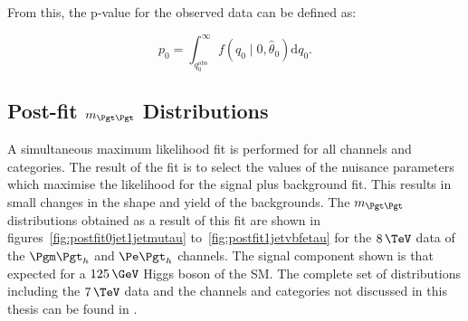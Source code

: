 From this, the p-value for the observed data can be defined as:

\begin{equation}
p_{0} =
\int_{q_{0}^{\mathrm{obs}}}^{\infty}f(q_{0}\mid0,\hat{\theta}_{0})\mathrm{d}q_{0}
.
\end{equation}


\subsection{Post-fit $m_{\Pgt\Pgt}$ Distributions}

A simultaneous maximum likelihood fit is performed for all channels and
categories. The result of the fit is to select the values of the nuisance
parameters which maximise the likelihood for the signal plus background fit.
This results in small changes in the shape and yield of the backgrounds. The
$m_{\Pgt\Pgt}$ distributions obtained as a result of this fit are shown in  
figures~\ref{fig:postfit0jet1jetmutau} to~\ref{fig:postfit1jetvbfetau} 
for the $8\,\TeV$ data of the $\mutau$ and $\etau$ channels. The signal
component shown is that expected for a $125\,\GeV$ Higgs boson of the \ac{SM}.
The complete set of distributions including the $7\,\TeV$ data and the channels and categories
not discussed in this thesis can be found in \cite{HIG-13-004}.

